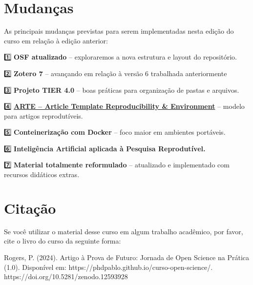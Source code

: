 \documentclass[
  a4paper,
]{book}
\begin{document}
\section*{Mudanças}\label{sec-change}


As principais mudanças previstas para serem implementadas nesta edição
do curso em relação à edição anterior:

1️⃣ \textbf{OSF atualizado} -- exploraremos a nova estrutura e layout do
repositório.

2️⃣ \textbf{Zotero 7} -- avançando em relação à versão 6 trabalhada
anteriormente

3️⃣ \textbf{Projeto TIER 4.0} -- boas práticas para organização de pastas
e arquivos.

4️⃣ \href{https://phdpablo.github.io/article-template/}{\textbf{ARTE --
Article Template Reproducibility \& Environment}} -- modelo para artigos
reprodutíveis.

5️⃣ \textbf{Conteinerização com Docker} -- foco maior em ambientes
portáveis.

6️⃣ \textbf{Inteligência Artificial aplicada à Pesquisa Reprodutível.}

7️⃣ \textbf{Material totalmente reformulado} -- atualizado e implementado
com recursos didáticos extras.

\newpage

\section*{Citação}\label{sec-cite}


Se você utilizar o material desse curso em algum trabalho acadêmico, por
favor, cite o livro do curso da seguinte forma:

\begin{tcolorbox}[enhanced jigsaw, colback=white, left=2mm, bottomrule=.15mm, opacityback=0, toprule=.15mm, arc=.35mm, rightrule=.15mm, leftrule=.75mm, breakable, colframe=quarto-callout-important-color-frame]

Rogers, P. (2024). Artigo à Prova de Futuro: Jornada de Open Science na
Prática (1.0). Disponível em:
https://phdpablo.github.io/curso-open-science/.
https://doi.org/10.5281/zenodo.12593928

\end{tcolorbox}
\end{document}
